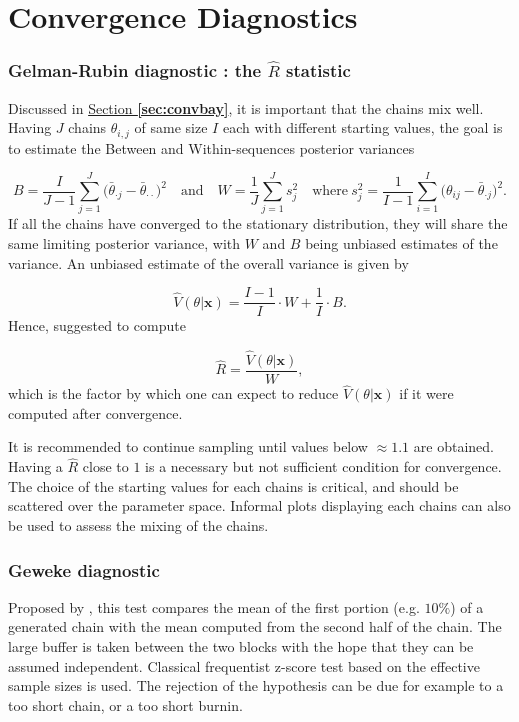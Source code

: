 \section{Convergence Diagnostics}\label{app:convdiag}


\subsubsection*{Gelman-Rubin diagnostic : the $\hat{R}$ statistic}

Discussed in \hyperref[sec:convbay]{Section \textbf{\ref{sec:convbay}}}, it is important that the chains mix well. Having $J$ chains $\theta_{i,j}$ of same size $I$ each with different starting values, the goal is to estimate the Between and Within-sequences posterior variances

\begin{equation*}
B= \frac{I}{J-1}\sum_{j=1}^J\big(\bar{\theta}_{\cdot j} - \bar{\theta}_{\cdot \cdot}\big)^2 \quad \text{and}\quad W=\frac{1}{J}\sum_{j=1}^Js^2_j \quad \text{where} \ s^2_j=\frac{1}{I-1}\sum_{i=1}^I\big(\theta_{ij}-\bar{\theta}_{\cdot j}\big)^2.
\end{equation*}
If all the chains have converged to the stationary distribution, they will share the same limiting posterior variance, with $W$ and $B$ being unbiased estimates of the variance. An unbiased estimate of the overall variance is given by 

\begin{equation}
\hat{V}(\theta|\boldsymbol{x})=\frac{I-1}{I}\cdot W+ \frac{1}{I}\cdot B.
\end{equation}
Hence, \citet{gelman1992} suggested to compute 

\begin{equation}\label{eq:rhat}
\hat{R}=\frac{\hat{V}(\theta|\boldsymbol{x})}{W},
\end{equation}
which is the factor by which one can expect to reduce $\hat{V}(\theta|\boldsymbol{x})$ if it were computed after convergence. 

It is recommended to continue sampling until values below $\approx 1.1$ are obtained. Having a $\hat{R}$ close to $1$ is a necessary but not sufficient condition for convergence. The choice of the starting values for each chains is critical, and should be scattered over the parameter space. Informal plots displaying each chains can also be used to assess the mixing of the chains.


\subsubsection*{Geweke diagnostic}
Proposed by \citet{Geweke92}, this test compares the mean of the first portion (e.g. $10\%$) of a generated chain with the mean computed from the second half of the chain. The large buffer is taken between the two blocks with the hope that they can be assumed independent. Classical frequentist z-score test based on the effective sample sizes is used. 
The rejection of the hypothesis can be due for example to a too short chain, or a too short burnin.

